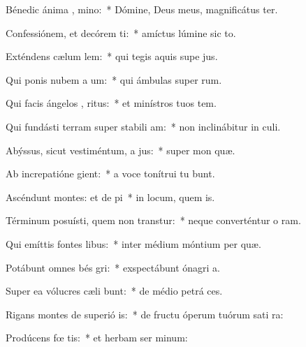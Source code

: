 \item Bénedic ánima , mino:~* Dómine, Deus meus, magnificátus  ter.
\item Confessiónem, et decórem ti:~* amíctus lúmine sic to.
\item Exténdens cælum  lem:~* qui tegis aquis supe jus.
\item Qui ponis nubem a um:~* qui ámbulas super  rum.
\item Qui facis ángelos , ritus:~* et minístros tuos  tem.
\item Qui fundásti terram super stabili am:~* non inclinábitur in  culi.
\item Abýssus, sicut vestiméntum, a jus:~* super mon  quæ.
\item Ab increpatióne  gient:~* a voce tonítrui tu bunt.
\item Ascéndunt montes: et de pi~* in locum, quem  is.
\item Términum posuísti, quem non transtur:~* neque converténtur o ram.
\item Qui emíttis fontes  libus:~* inter médium móntium per quæ.
\item Potábunt omnes bés gri:~* exspectábunt ónagri   a.
\item Super ea vólucres cæli bunt:~* de médio petrá  ces.
\item Rigans montes de superió is:~* de fructu óperum tuórum sati ra:
\item Prodúcens fœ tis:~* et herbam ser minum:
